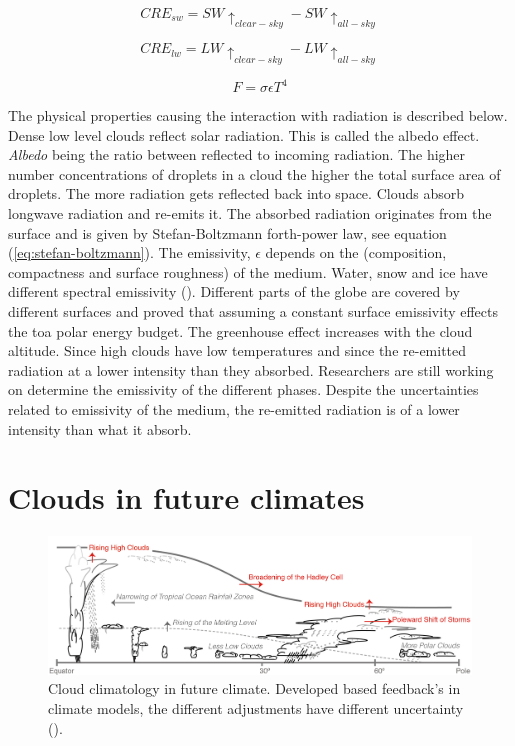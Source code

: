 \begin{equation} \label{eq:cre_sw}
    CRE_{sw} = SW\uparrow_{clear-sky} - SW\uparrow_{all-sky}
\end{equation}

\begin{equation} \label{eq:cre_lw}
    CRE_{lw} = LW\uparrow_{clear-sky} - LW\uparrow_{all-sky}
\end{equation}

\begin{equation} \label{eq:stefan-boltzmann}
    F = \sigma \epsilon T ^4
\end{equation}

The physical properties causing the interaction with radiation is described below. Dense low level clouds reflect solar radiation. This is called the albedo effect. \textit{Albedo} being the ratio between reflected to incoming radiation. The higher number concentrations of droplets in a cloud the higher the total surface area of droplets. The more radiation gets reflected back into space. Clouds absorb longwave radiation and re-emits it. The absorbed radiation originates from the surface and is given by Stefan-Boltzmann forth-power law, see equation (\ref{eq:stefan-boltzmann}). The emissivity, $\epsilon$ depends on the (composition, compactness and surface roughness) of the medium. Water, snow and ice have different spectral emissivity (\cite{Huang2018ImprovedClimate}). Different parts of the globe are covered by different surfaces and \citeauthor{Huang2016AnSimulations} proved that assuming a constant surface emissivity effects the \acrshort{toa} polar energy budget. The greenhouse effect increases with the cloud altitude. Since high clouds have low temperatures and since the re-emitted radiation at a lower intensity than they absorbed. Researchers are still working on determine the emissivity of the different phases. Despite the uncertainties related to emissivity of the medium, the re-emitted radiation is of a lower intensity than what it absorb.

\section{Clouds in future climates} \label{sec:intro_cloud_future_climates}
\begin{figure}[h]
    \centering
    \includegraphics[scale = 0.8]{Chapter1_Intro/images/Fig7-11_ipcc.jpg}
    \caption{Cloud climatology in future climate. Developed based feedback's in climate models, the different adjustments have different uncertainty (\cite{IPCC_CH7_clouds}).}
    \label{fig:cloud_scheme}
\end{figure}

